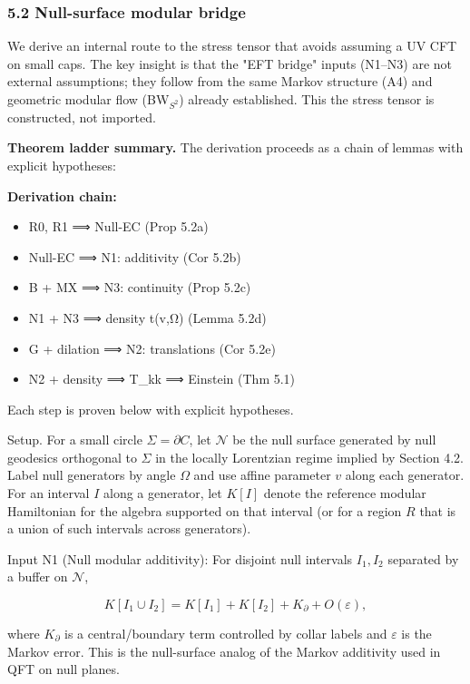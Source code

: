 \subsubsection{5.2 Null-surface modular bridge}\label{52-null-surface-modular-bridge}

We derive an internal route to the stress tensor that avoids assuming a UV CFT on small caps. The key insight is that the "EFT bridge" inputs (N1--N3) are not external assumptions; they follow from the same Markov structure (A4) and geometric modular flow (BW\(_{S^2}\)) already established. This the stress tensor is constructed, not imported.

\textbf{Theorem ladder summary.} The derivation proceeds as a chain of lemmas with explicit hypotheses:

\textbf{Derivation chain:}

\begin{itemize}
\tightlist
\item
  R0, R1 ⟹ Null-EC (Prop 5.2a)
\item
  Null-EC ⟹ N1: additivity (Cor 5.2b)
\item
  B + MX ⟹ N3: continuity (Prop 5.2c)
\item
  N1 + N3 ⟹ density t(v,Ω) (Lemma 5.2d)
\item
  G + dilation ⟹ N2: translations (Cor 5.2e)
\item
  N2 + density ⟹ T\_kk ⟹ Einstein (Thm 5.1)
\end{itemize}

Each step is proven below with explicit hypotheses.

Setup. For a small circle \(\Sigma = \partial C\), let \(\mathcal N\) be the null surface generated by null geodesics orthogonal to \(\Sigma\) in the locally Lorentzian regime implied by Section 4.2. Label null generators by angle \(\Omega\) and use affine parameter \(v\) along each generator. For an interval \(I\) along a generator, let \(K[I]\) denote the reference modular Hamiltonian for the algebra supported on that interval (or for a region \(R\) that is a union of such intervals across generators).

Input N1 (Null modular additivity): For disjoint null intervals \(I_1, I_2\) separated by a buffer on \(\mathcal N\),

\[
K[I_1 \cup I_2] = K[I_1] + K[I_2] + K_{\partial} + O(\varepsilon),
\]

where \(K_{\partial}\) is a central/boundary term controlled by collar labels and \(\varepsilon\) is the Markov error. This is the null-surface analog of the Markov additivity used in QFT on null planes.

